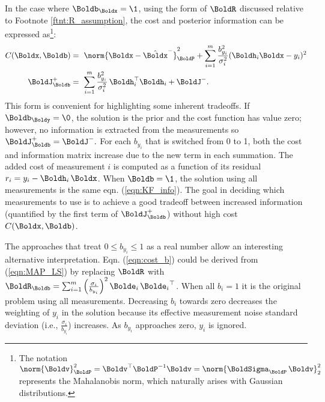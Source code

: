 In the case where $\Boldb_\Boldx = \1$, using the form of $\BoldR$ discussed relative to Footnote \ref{ftnt:R_assumption}, the cost and posterior information can be expressed as\footnote{The notation $\norm{ \Boldv}_{\BoldP}^2=\Boldv^\top  	\BoldP^{-1} \Boldv=\norm{ \BoldSigma_\BoldP \, \Boldv }_2^2$ represents the Mahalanobis norm, which naturally arises with Gaussian distributions.}:
\begin{align}\label{eqn:cost_b}
	C( \Boldx,\Boldb) &= ~
	\norm{ \Boldx - \hat{\Boldx}^-}_{\BoldP}^2 
	+   \sum_{i=1}^{m} \frac{b_{y_i}^2}{\sigma_i^2} (\Boldh_i \Boldx- y_i)^2 
	\\
	\label{eqn:PosteriorInformation_b}
	\BoldJ_{\Boldb}^+  &= ~ 
	\sum_{i=1}^{m} \frac{b_{y_i}^2}{\sigma_i^2}  \, \Boldh_i^\top \Boldh_i 
		+  \BoldJ^-.
\end{align}	
This form is convenient for highlighting some inherent tradeoffs.
If $\Boldb_\Boldy = \0$, the solution is the prior and the cost function has value zero; however, no information is  extracted from the measurements so $\BoldJ_{\Boldb}^+  =  \BoldJ^-.$
For each $b_{y_i}$ that is switched from 0 to 1, both the cost and information matrix increase due to the new term in each summation.
The added cost of measurement $i$ is computed as a function of its residual $r_i =y_i - \Boldh_i \, \Boldx$.
When $\Boldb=\1$, the solution using all measurements is the same eqn. (\ref{eqn:KF_info}).
The goal in deciding which measurements to use is to achieve a good tradeoff between increased information  (quantified by the first term of $\BoldJ_{\Boldb}^+$) without high cost $C( \Boldx,\Boldb)$.


The approaches that treat $0 \le b_{y_i} \le 1$ as a real number allow an interesting alternative interpretation. 
Eqn. (\ref{eqn:cost_b})  could be derived from (\ref{eqn:MAP_LS}) by replacing $\BoldR$ with
$\BoldR_\Boldb = \sum_{i=1}^{m} \left(\frac{\sigma_i}{b_{y_i}}\right)^2  \Bolde_i  \,{\Bolde_i}^\top$.
When all $b_i=1$ it is the original problem using all measurements. 
Decreasing $b_i$ towards zero decreases the weighting of $y_i$ in the solution because its effective measurement noise standard deviation (i.e., $\frac{\sigma_i}{b_{y_i}}$) increases.
As 	$b_{y_i}$ approaches zero, $y_i$ is ignored.

%


